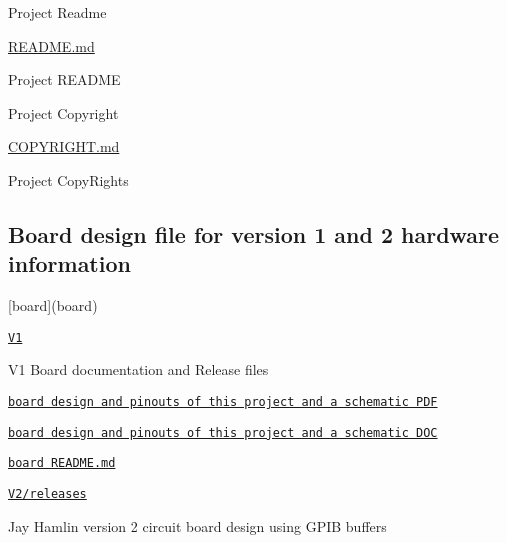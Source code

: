 \begin{DoxyItemize}
\begin{DoxyItemize}
\end{DoxyItemize}
\item Project Readme
\begin{DoxyItemize}
\item \hyperlink{md_README}{R\+E\+A\+D\+ME.md}
\begin{DoxyItemize}
\item Project R\+E\+A\+D\+ME
\end{DoxyItemize}
\end{DoxyItemize}
\item Project Copyright
\begin{DoxyItemize}
\item \hyperlink{COPYRIGHT_8md}{C\+O\+P\+Y\+R\+I\+G\+HT.md}
\begin{DoxyItemize}
\item Project Copy\+Rights
\end{DoxyItemize}
\end{DoxyItemize}
\end{DoxyItemize}

\subsection*{Board design file for version 1 and 2 hardware information}


\begin{DoxyItemize}
\item \mbox{[}board\mbox{]}(board)
\begin{DoxyItemize}
\item \href{board/V1}{\tt V1}
\begin{DoxyItemize}
\item V1 Board documentation and Release files
\item \href{board/V1/HP85Disk.pdf}{\tt board design and pinouts of this project and a schematic P\+DF}
\item \href{board/V1//HP85Disk.doc}{\tt board design and pinouts of this project and a schematic D\+OC}
\item \href{board/V1/HP85Disk.doc}{\tt board R\+E\+A\+D\+M\+E.\+md}
\end{DoxyItemize}
\item \href{V2/releses}{\tt V2/releases}
\begin{DoxyItemize}
\item Jay Hamlin version 2 circuit board design using G\+P\+IB buffers
\end{DoxyItemize}
\end{DoxyItemize}
\end{DoxyItemize}

